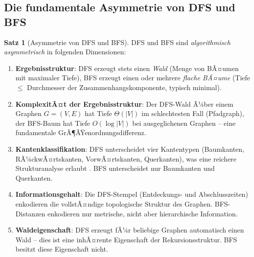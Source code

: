 ﻿\documentclass[a4paper,12pt]{report}
\theoremstyle{definition}
\newtheorem{theorem}{Satz}[chapter]
\theoremstyle{remark}
\begin{document}
\subsection{Die fundamentale Asymmetrie von DFS und BFS}

\begin{theorem}[Asymmetrie von DFS und BFS]
\label{thm:asymmetrie}
DFS und BFS sind \emph{algorithmisch asymmetrisch} in folgenden Dimensionen:
\begin{enumerate}[label=(\roman*)]
  \item \textbf{Ergebnisstruktur}: DFS erzeugt stets einen \emph{Wald}
        (Menge von BÃ¤umen mit maximaler Tiefe), BFS erzeugt einen oder
        mehrere \emph{flache BÃ¤ume} (Tiefe $\leq$ Durchmesser der
        Zusammenhangskomponente, typisch minimal).
  \item \textbf{KomplexitÃ¤t der Ergebnisstruktur}: Der DFS-Wald Ã¼ber
        einem Graphen $G = (V, E)$ hat Tiefe $\Theta(|V|)$ im
        schlechtesten Fall (Pfadgraph), der BFS-Baum hat Tiefe
        $O(\log |V|)$ bei ausgeglichenen Graphen -- eine fundamentale
        GrÃ¶ÃŸenordnungsdifferenz.
  \item \textbf{Kantenklassifikation}: DFS unterscheidet vier Kantentypen
        (Baumkanten, RÃ¼ckwÃ¤rtskanten, VorwÃ¤rtskanten, Querkanten), was eine
        reichere Strukturanalyse erlaubt \cite{Cormen2009}. BFS unterscheidet
        nur Baumkanten und Querkanten.
  \item \textbf{Informationsgehalt}: Die DFS-Stempel (Entdeckungs- und
        Abschlusszeiten) enkodieren die vollstÃ¤ndige topologische Struktur
        des Graphen. BFS-Distanzen enkodieren nur metrische, nicht aber
        hierarchische Information.
  \item \textbf{Waldeigenschaft}: DFS erzeugt fÃ¼r beliebige Graphen
        automatisch einen Wald -- dies ist eine inhÃ¤rente Eigenschaft der
        Rekursionsstruktur. BFS besitzt diese Eigenschaft nicht.
\end{enumerate}
\end{theorem}
\end{document}
